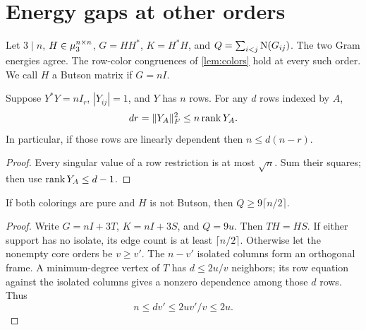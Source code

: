 \section{Energy gaps at other orders}\label{sec:generalization}
Let $3\mid n$, $H\in\mu_3^{n\times n}$, $G=HH^*$, $K=H^*H$, and $Q=\sum_{i<j}\operatorname N(G_{ij})$. The two Gram energies agree. The row-color congruences of \cref{lem:colors} hold at every such order. We call $H$ a Butson matrix if $G=nI$.

\begin{lemma}\label{lem:frame-new}
Suppose $Y^*Y=nI_r$, $|Y_{ij}|=1$, and $Y$ has $n$ rows. For any $d$ rows indexed by $A$,
\[dr=\|Y_A\|_F^2\le n\operatorname{rank} Y_A.\]
In particular, if those rows are linearly dependent then $n\le d(n-r)$.
\end{lemma}
\begin{proof}
Every singular value of a row restriction is at most $\sqrt n$. Sum their squares; then use $\operatorname{rank} Y_A\le d-1$.
\end{proof}

\begin{theorem}\label{thm:pure-general}
If both colorings are pure and $H$ is not Butson, then $Q\ge9\lceil n/2\rceil$.
\end{theorem}
\begin{proof}
Write $G=nI+3T$, $K=nI+3S$, and $Q=9u$. Then $TH=HS$. If either support has no isolate, its edge count is at least $\lceil n/2\rceil$. Otherwise let the nonempty core orders be $v\ge v'$. The $n-v'$ isolated columns form an orthogonal frame. A minimum-degree vertex of $T$ has $d\le2u/v$ neighbors; its row equation against the isolated columns gives a nonzero dependence among those $d$ rows. Thus
\[n\le dv'\le 2uv'/v\le2u.\]
\end{proof}

